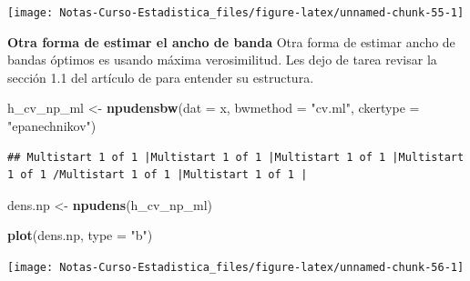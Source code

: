 \documentclass[
  12pt,
]{book}
\newenvironment{Shaded}{\begin{snugshade}}{\end{snugshade}}
\newcommand{\DataTypeTok}[1]{\textcolor[rgb]{0.13,0.29,0.53}{#1}}
\newcommand{\KeywordTok}[1]{\textcolor[rgb]{0.13,0.29,0.53}{\textbf{#1}}}
\newcommand{\NormalTok}[1]{#1}
\newcommand{\StringTok}[1]{\textcolor[rgb]{0.31,0.60,0.02}{#1}}
\theoremstyle{definition}
\theoremstyle{definition}
\theoremstyle{definition}
\theoremstyle{remark}
\begin{document}
\begin{center}\texttt{[image: Notas-Curso-Estadistica\_files/figure-latex/unnamed-chunk-55-1]} \end{center}

\textbf{Otra forma de estimar el ancho de banda} Otra forma de estimar ancho de bandas óptimos es usando máxima verosimilitud. Les dejo de tarea revisar la sección 1.1 del artículo de \autocite{Hall1987} para entender su estructura.

\begin{Shaded}
\begin{Highlighting}[]
\NormalTok{h_cv_np_ml <-}\StringTok{ }\KeywordTok{npudensbw}\NormalTok{(}\DataTypeTok{dat =}\NormalTok{ x, }\DataTypeTok{bwmethod =} \StringTok{"cv.ml"}\NormalTok{, }
    \DataTypeTok{ckertype =} \StringTok{"epanechnikov"}\NormalTok{)}
\end{Highlighting}
\end{Shaded}

\begin{verbatim}
## Multistart 1 of 1 |Multistart 1 of 1 |Multistart 1 of 1 |Multistart 1 of 1 /Multistart 1 of 1 |Multistart 1 of 1 |                   
\end{verbatim}

\begin{Shaded}
\begin{Highlighting}[]
\NormalTok{dens.np <-}\StringTok{ }\KeywordTok{npudens}\NormalTok{(h_cv_np_ml)}

\KeywordTok{plot}\NormalTok{(dens.np, }\DataTypeTok{type =} \StringTok{"b"}\NormalTok{)}
\end{Highlighting}
\end{Shaded}

\begin{center}\texttt{[image: Notas-Curso-Estadistica\_files/figure-latex/unnamed-chunk-56-1]} \end{center}
\end{document}
